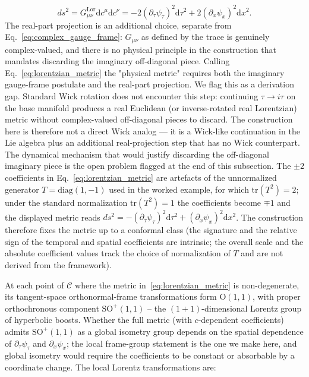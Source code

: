 \documentclass[11pt]{article}
\begin{document}
\begin{equation}
\boxed{ds^2 = G^{\mathrm{Lor}}_{\mu\nu} \mathrm{d}c^\mu \mathrm{d}c^\nu = -2(\partial_\tau \psi_\tau)^2 \mathrm{d}\tau^2 + 2(\partial_x \psi_x)^2 \mathrm{d}x^2.}
\label{eq:lorentzian_metric}
\end{equation}
The real-part projection is an additional choice, separate from Eq.~\eqref{eq:complex_gauge_frame}: $G_{\mu\nu}$ as defined by the trace is genuinely complex-valued, and there is no physical principle in the construction that mandates discarding the imaginary off-diagonal piece. Calling Eq.~\eqref{eq:lorentzian_metric} the "physical metric" requires both the imaginary gauge-frame postulate and the real-part projection. We flag this as a derivation gap. Standard Wick rotation does not encounter this step: continuing $\tau \to i\tau$ on the base manifold produces a real Euclidean (or inverse-rotated real Lorentzian) metric without complex-valued off-diagonal pieces to discard. The construction here is therefore not a direct Wick analog --- it is a Wick-like continuation in the Lie algebra plus an additional real-projection step that has no Wick counterpart. The dynamical mechanism that would justify discarding the off-diagonal imaginary piece is the open problem flagged at the end of this subsection. The $\pm 2$ coefficients in Eq.~\eqref{eq:lorentzian_metric} are artefacts of the unnormalized generator $T = \mathrm{diag}(1, -1)$ used in the worked example, for which $\mathrm{tr}(T^2) = 2$; under the standard normalization $\mathrm{tr}(T^2) = 1$ the coefficients become $\mp 1$ and the displayed metric reads $ds^2 = -(\partial_\tau \psi_\tau)^2 \mathrm{d}\tau^2 + (\partial_x \psi_x)^2 \mathrm{d}x^2$. The construction therefore fixes the metric up to a conformal class (the signature and the relative sign of the temporal and spatial coefficients are intrinsic; the overall scale and the absolute coefficient values track the choice of normalization of $T$ and are not derived from the framework).

At each point of $\mathcal{C}$ where the metric in~\eqref{eq:lorentzian_metric} is non-degenerate, its tangent-space orthonormal-frame transformations form $\mathrm{O}(1,1)$, with proper orthochronous component $\mathrm{SO}^+(1,1)$ -- the $(1{+}1)$-dimensional Lorentz group of hyperbolic boosts. Whether the full metric (with $c$-dependent coefficients) admits $\mathrm{SO}^+(1,1)$ as a global isometry group depends on the spatial dependence of $\partial_\tau\psi_\tau$ and $\partial_x\psi_x$; the local frame-group statement is the one we make here, and global isometry would require the coefficients to be constant or absorbable by a coordinate change. The local Lorentz transformations are:
\end{document}
